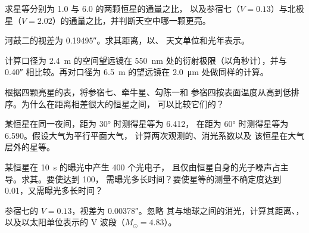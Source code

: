 \begin{exercise}[$\star$]\label{exo:b1:observing-the-sky:1}
求星等分别为 1.0 与 6.0 的两颗恒星的通量之比，
以及参宿七（$V = 0.13$）与北极星（$V = 2.02$）的通量之比，并判断天空中哪一颗更亮。
\end{exercise}

\begin{exercise}[$\star$]\label{exo:b1:observing-the-sky:2}
河鼓二的视差为 \ang{;;0.19495}。求其距离，以、
天文单位和光年表示。
\end{exercise}

\begin{exercise}[$\star$]\label{exo:b1:observing-the-sky:3}
计算口径为 \qty{2.4}{m} 的空间望远镜在
\qty{550}{nm} 处的衍射极限（以角秒计），并与
\ang{;;0.40} 相比较。再对口径为 \qty{6.5}{m} 的望远镜在
\qty{2.0}{\micro\metre} 处做同样的计算。
\end{exercise}

\begin{exercise}[$\star$]\label{exo:b1:observing-the-sky:4}
根据四颗亮星的表，将参宿七、牵牛星、勾陈一和
参宿四按表面温度从高到低排序。为什么在距离相差很大的恒星之间，
可以比较它们的？
\end{exercise}

\begin{exercise}[$\star\star$]\label{exo:b1:observing-the-sky:5}
某恒星在同一夜间，距为 \ang{30} 时测得星等为 6.412，
在距为 \ang{60} 时测得星等为 6.590。假设大气为平行平面大气，
计算两次观测的、消光系数以及
该恒星在大气层外的星等。
\end{exercise}

\begin{exercise}[$\star\star$]\label{exo:b1:observing-the-sky:6}
某恒星在 \qty{10}{s} 的曝光中产生 400 个光电子，
且仅由恒星自身的光子噪声占主导。求其。要使达到 100，
需曝光多长时间？要使星等的测量不确定度达到
\num{0.01}，又需曝光多长时间？
\end{exercise}

\begin{exercise}[$\star\star$]\label{exo:b1:observing-the-sky:7}
参宿七的 $V = 0.13$，视差为 \ang{;;0.00378}。忽略
其与地球之间的消光，计算其距离、，
以及以太阳单位表示的 V 波段（$M_\odot = 4.83$）。
\end{exercise}

